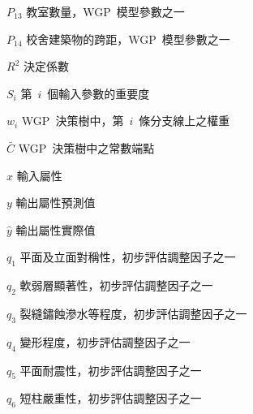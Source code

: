 \begin{SymEntry}
\item[$P_{13}$]
教室數量，WGP~模型參數之一

\item[$P_{14}$]
校舍建築物的跨距，WGP~模型參數之一

\item[$R^2$]
決定係數

\item[$S_i$]
第~$i$~個輸入參數的重要度

\item[$w_i$]
WGP~決策樹中，第~$i$~條分支線上之權重

\item[$\bar{C}$]
WGP~決策樹中之常數端點

\item[$x$]
輸入屬性

\item[$y$]
輸出屬性預測值

\item[$\hat{y}$]
輸出屬性實際值

\item[$q_1$]
平面及立面對稱性，初步評估調整因子之一

\item[$q_2$]
軟弱層顯著性，初步評估調整因子之一

\item[$q_3$]
裂縫鏽蝕滲水等程度，初步評估調整因子之一

\item[$q_4$]
變形程度，初步評估調整因子之一

\item[$q_5$]
平面耐震性，初步評估調整因子之一

\item[$q_6$]
短柱嚴重性，初步評估調整因子之一

\end{SymEntry}